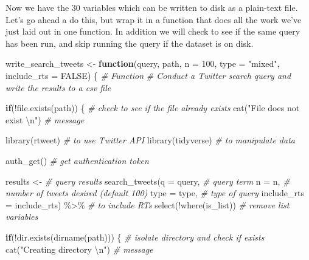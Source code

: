 \documentclass[
]{article}
\newenvironment{Shaded}{\begin{snugshade}}{\end{snugshade}}
\newcommand{\AttributeTok}[1]{\textcolor[rgb]{0.77,0.63,0.00}{#1}}
\newcommand{\CommentTok}[1]{\textcolor[rgb]{0.56,0.35,0.01}{\textit{#1}}}
\newcommand{\ConstantTok}[1]{\textcolor[rgb]{0.00,0.00,0.00}{#1}}
\newcommand{\ControlFlowTok}[1]{\textcolor[rgb]{0.13,0.29,0.53}{\textbf{#1}}}
\newcommand{\DecValTok}[1]{\textcolor[rgb]{0.00,0.00,0.81}{#1}}
\newcommand{\FunctionTok}[1]{\textcolor[rgb]{0.00,0.00,0.00}{#1}}
\newcommand{\NormalTok}[1]{#1}
\newcommand{\OtherTok}[1]{\textcolor[rgb]{0.56,0.35,0.01}{#1}}
\newcommand{\SpecialCharTok}[1]{\textcolor[rgb]{0.00,0.00,0.00}{#1}}
\newcommand{\StringTok}[1]{\textcolor[rgb]{0.31,0.60,0.02}{#1}}
\begin{document}
Now we have the 30 variables which can be written to disk as a plain-text file. Let's go ahead a do this, but wrap it in a function that does all the work we've just laid out in one function. In addition we will check to see if the same query has been run, and skip running the query if the dataset is on disk.

\begin{Shaded}
\begin{Highlighting}[]
\NormalTok{write\_search\_tweets }\OtherTok{\textless{}{-}} 
  \ControlFlowTok{function}\NormalTok{(query, path, }\AttributeTok{n =} \DecValTok{100}\NormalTok{, }\AttributeTok{type =} \StringTok{"mixed"}\NormalTok{, }\AttributeTok{include\_rts =} \ConstantTok{FALSE}\NormalTok{) \{}
    \CommentTok{\# Function}
    \CommentTok{\# Conduct a Twitter search query and write the results to a csv file}
    
    \ControlFlowTok{if}\NormalTok{(}\SpecialCharTok{!}\FunctionTok{file.exists}\NormalTok{(path)) \{ }\CommentTok{\# check to see if the file already exists}
      \FunctionTok{cat}\NormalTok{(}\StringTok{"File does not exist }\SpecialCharTok{\textbackslash{}n}\StringTok{"}\NormalTok{) }\CommentTok{\# message}
      
      \FunctionTok{library}\NormalTok{(rtweet) }\CommentTok{\# to use Twitter API}
      \FunctionTok{library}\NormalTok{(tidyverse) }\CommentTok{\# to manipulate data}
      
      \FunctionTok{auth\_get}\NormalTok{() }\CommentTok{\# get authentication token}
      
\NormalTok{      results }\OtherTok{\textless{}{-}} \CommentTok{\# query results}
        \FunctionTok{search\_tweets}\NormalTok{(}\AttributeTok{q =}\NormalTok{ query, }\CommentTok{\# query term}
                      \AttributeTok{n =}\NormalTok{ n, }\CommentTok{\# number of tweets desired (default 100)}
                      \AttributeTok{type =}\NormalTok{ type, }\CommentTok{\# type of query}
                      \AttributeTok{include\_rts =}\NormalTok{ include\_rts) }\SpecialCharTok{\%\textgreater{}\%}  \CommentTok{\# to include RTs}
        \FunctionTok{select}\NormalTok{(}\SpecialCharTok{!}\FunctionTok{where}\NormalTok{(is\_list))  }\CommentTok{\# remove list variables}
      
      \ControlFlowTok{if}\NormalTok{(}\SpecialCharTok{!}\FunctionTok{dir.exists}\NormalTok{(}\FunctionTok{dirname}\NormalTok{(path))) \{ }\CommentTok{\# isolate directory and check if exists}
        \FunctionTok{cat}\NormalTok{(}\StringTok{"Creating directory }\SpecialCharTok{\textbackslash{}n}\StringTok{"}\NormalTok{) }\CommentTok{\# message}
        

\end{Highlighting}
\end{Shaded}
\end{document}
